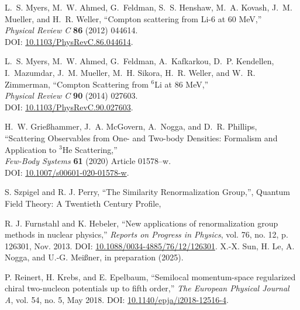 \documentclass[12pt]{article}
\newcommand{\3}{\ss}
\numberwithin{equation}{section}
\begin{document}
\begin{thebibliography}{44}
L.~S. Myers, M.~W. Ahmed, G.~Feldman, S.~S. Henshaw, M.~A. Kovash, J.~M. Mueller, and H.~R. Weller, 
``Compton scattering from Li-6 at 60 MeV,''\\ 
\textit{Physical Review C} \textbf{86} (2012) 044614.\\ 
DOI: \href{https://doi.org/10.1103/PhysRevC.86.044614}{10.1103/PhysRevC.86.044614}.

L.~S. Myers, M.~W. Ahmed, G.~Feldman, A.~Kafkarkou, D.~P. Kendellen, I.~Mazumdar, J.~M. Mueller, M.~H. Sikora, H.~R. Weller, and W.~R. Zimmerman, 
``Compton Scattering from $^6$Li at 86 MeV,''\\ 
\textit{Physical Review C} \textbf{90} (2014) 027603.\\ 
DOI: \href{https://doi.org/10.1103/PhysRevC.90.027603}{10.1103/PhysRevC.90.027603}.

H.~W. Grießhammer, J.~A. McGovern, A.~Nogga, and D.~R. Phillips, 
``Scattering Observables from One- and Two-body Densities: Formalism and Application to $^3$He Scattering,''\\ 
\textit{Few-Body Systems} \textbf{61} (2020) Article 01578–w.\\ 
DOI: \href{http://dx.doi.org/10.1007/s00601-020-01578-w}{10.1007/s00601-020-01578-w}.

S. Szpigel and R. J. Perry, ``The Similarity Renormalization Group,'', Quantum Field Theory: A Twentieth Century Profile,

R. J. Furnstahl and K. Hebeler, ``New applications of
renormalization group methods in nuclear physics,'' \textit{Reports
on Progress in Physics}, vol. 76, no. 12, p. 126301, Nov. 2013.
DOI:
\href{http://dx.doi.org/10.1088/0034-4885/76/12/126301}{10.1088/0034-4885/76/12/126301}.
X.-X. Sun, H. Le, A. Nogga, and U.-G. Meißner, in preparation (2025).

P. Reinert, H. Krebs, and E. Epelbaum, ``Semilocal momentum-space
regularized chiral two-nucleon potentials up to fifth order,''
\textit{The European Physical Journal A}, vol. 54, no. 5, May 2018.
DOI:
\href{http://dx.doi.org/10.1140/epja/i2018-12516-4}{10.1140/epja/i2018-12516-4}.
\end{thebibliography}
\end{document}
